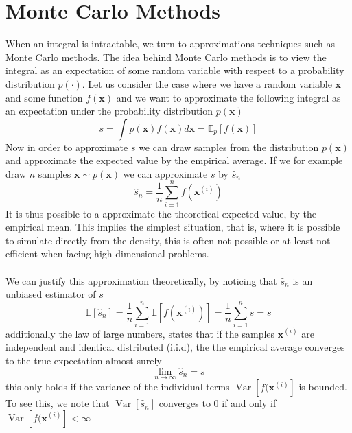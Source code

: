 \section{Monte Carlo Methods}\label{sec:MC_methods}
When an integral is intractable, we turn to approximations techniques such as Monte Carlo methods. The idea behind Monte Carlo methods is to view the integral as an expectation of some random variable with respect to a probability distribution $p(\cdot)$. Let us consider the case where we have a random variable $\mathbf{x}$ and some function $f(\mathbf{x})$ and we want to approximate the following integral as an expectation under the probability distribution $p(\mathbf{x})$ 
\begin{equation*}
    s=\int p(\mathbf{x}) f(\mathbf{x}) d \mathbf{x}=\mathbb{E}_{p}[f(\mathbf{x})]
\end{equation*}
Now in order to approximate $s$ we can draw samples from the distribution $p(\mathbf{x})$ and approximate the expected value by the empirical average. If we for example draw $n$ samples $\mathbf{x}\sim p(\mathbf{x})$ we can approximate $s$ by $\hat{s}_n$
\begin{equation}\label{eq:empirical_mean_MC}
        \hat{s}_{n}=\frac{1}{n} \sum_{i=1}^{n} f\left(\mathbf{x}^{(i)}\right)
\end{equation}
It is thus possible to a approximate the theoretical expected value, by the empirical mean. This implies the simplest situation, that is, where it is possible to simulate directly from the density, this is often not possible or at least not efficient when facing high-dimensional problems.\\
\\
We can justify this approximation theoretically, by noticing that $\hat{s}_n$ is an unbiased estimator of $s$
\begin{equation*}
    \mathbb{E}\left[\hat{s}_{n}\right]=\frac{1}{n} \sum_{i=1}^{n} \mathbb{E}\left[f\left(\mathbf{x}^{(i)}\right)\right]=\frac{1}{n} \sum_{i=1}^{n} s=s
\end{equation*}
additionally the law of large numbers, states that if the samples $\mathbf{x}^{(i)}$ are independent and identical distributed (i.i.d), the the empirical average converges to the true expectation almost surely
\begin{equation*}
    \lim _{n \rightarrow \infty} \hat{s}_{n}=s
\end{equation*}
this only holds if the variance of the individual terms $\operatorname{Var}[f(\mathbf{x}^{(i)}]$ is bounded. To see this, we note that $\operatorname{Var}[\hat{s}_n]$ converges to 0 if and only if $\operatorname{Var}[f(\mathbf{x}^{(i)}]<\infty$

